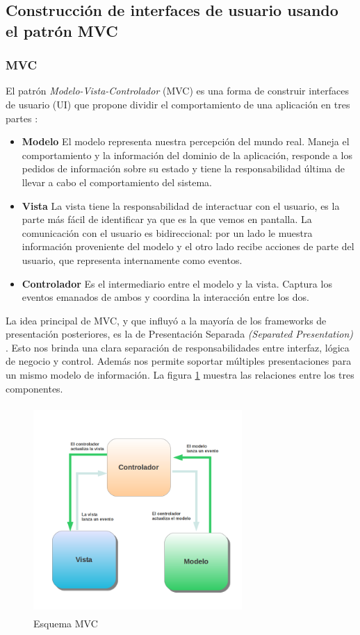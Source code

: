 \subsection{Construcción de interfaces de usuario usando el patrón MVC}
	\subsubsection{MVC}
	El patrón \emph{Modelo-Vista-Controlador} (MVC) es una forma de construir
	interfaces de usuario (UI) que propone dividir el comportamiento de una
	aplicación en tres partes \cite{reenskaug79}:
		\begin {itemize}
		\item {\bf Modelo}
			El modelo representa nuestra percepción del mundo real. 
			Maneja el comportamiento y la información del dominio de la aplicación,
			responde a los pedidos de información sobre su estado y tiene la
			responsabilidad última de llevar a cabo el comportamiento del sistema.
			
		\item {\bf Vista}
			La vista tiene la responsabilidad de interactuar con el usuario, es la
			parte más fácil de identificar ya que es la que vemos en pantalla.
			La comunicación con el usuario es bidireccional:
			por un lado le muestra información proveniente del modelo y el otro lado
			recibe acciones de parte del usuario, que representa internamente como eventos.
			
		\item {\bf Controlador}
			Es el intermediario entre el modelo y la vista.
			Captura los eventos emanados de ambos y coordina la interacción entre los
			dos.
	\end {itemize}
	 
	La idea principal de MVC, y que influyó a la mayoría de los frameworks de
	presentación posteriores, es la de Presentación Separada \emph{(Separated
	Presentation)} \cite{burbeck87}.
	Esto nos brinda una clara separación de responsabilidades entre interfaz,
	lógica de negocio y control. Además nos permite soportar múltiples
	presentaciones para un mismo modelo de información.
	La figura \ref{mvc} muestra las relaciones entre los tres componentes.  
	
	\begin{figure}[h]
		\centering
		\includegraphics[width=300px, height=300px]{img/mvc} 
		\caption{Esquema MVC}
		\label{mvc}
	\end{figure}  
	
